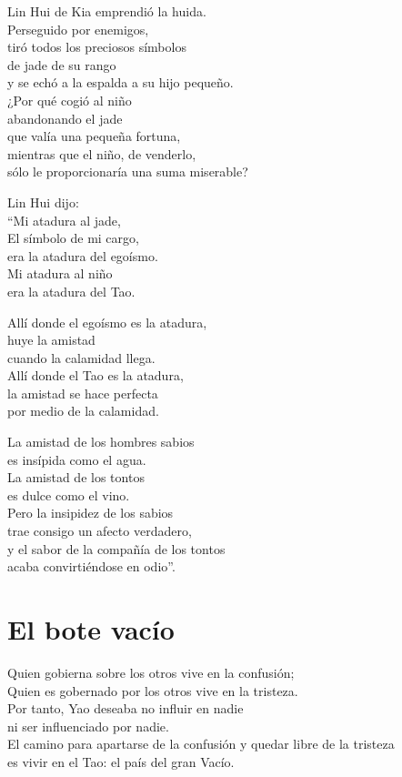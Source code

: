 \documentclass[hidelinks]{memoir}
\begin{document}
	Lin Hui de Kia emprendió la huida.\\
	Perseguido por enemigos,\\
	tiró todos los preciosos símbolos\\
	de jade de su rango\\
	y se echó a la espalda a su hijo pequeño.\\
	¿Por qué cogió al niño\\
	abandonando el jade\\
	que valía una pequeña fortuna,\\
	mientras que el niño, de venderlo,\\
	sólo le proporcionaría una suma miserable?
	
	Lin Hui dijo:\\
	``Mi atadura al jade,\\
	El símbolo de mi cargo,\\
	era la atadura del egoísmo.\\
	Mi atadura al niño\\
	era la atadura del Tao.
	
	Allí donde el egoísmo es la atadura,\\
	huye la amistad\\
	cuando la calamidad llega.\\
	Allí donde el Tao es la atadura,\\
	la amistad se hace perfecta\\
	por medio de la calamidad.
	
	La amistad de los hombres sabios\\
	es insípida como el agua.\\
	La amistad de los tontos\\
	es dulce como el vino.\\
	Pero la insipidez de los sabios\\
	trae consigo un afecto verdadero,\\
	y el sabor de la compañía de los tontos\\
	acaba convirtiéndose en odio''.
	
	\chapter*{El bote vacío}
	
	Quien gobierna sobre los otros vive en la confusión;\\
	Quien es gobernado por los otros vive en la tristeza.\\
	Por tanto, Yao deseaba no influir en nadie\\
	ni ser influenciado por nadie.\\
	El camino para apartarse de la confusión y quedar libre de la tristeza\\
	es vivir en el Tao: el país del gran Vacío.
	
\end{document}
